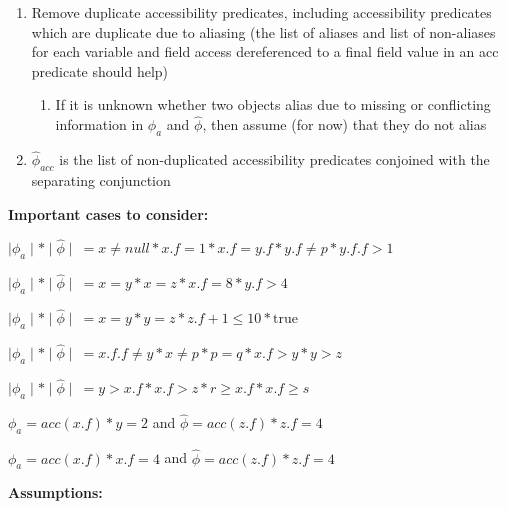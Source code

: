\documentclass {article}
\newcommand{\true}{\text{true}}
\newcommand{\fphi}{\widehat{\phi}}
\begin{document}
\begin{enumerate}
\item Remove duplicate accessibility predicates, including accessibility predicates which are duplicate due to aliasing (the list of aliases and list of non-aliases for each variable and field access dereferenced to a final field value in an acc predicate should help)
	\begin{enumerate}
	\item If it is unknown whether two objects alias due to missing or conflicting information in $\phi_a$ and $\fphi$, then assume (for now) that they do not alias
	\end{enumerate}
\item $\fphi_{acc}$ is the list of non-duplicated accessibility predicates conjoined with the separating conjunction
\end{enumerate}

\textbf{Important cases to consider:}

$\mid \phi_a \mid \ast \mid \fphi \mid \ = x \neq null \ast x.f = 1 \ast x.f = y.f \ast y.f \neq p \ast y.f.f > 1$

$\mid \phi_a \mid \ast \mid \fphi \mid \ = x = y \ast x = z \ast x.f = 8 \ast y.f > 4$

$\mid \phi_a \mid \ast \mid \fphi \mid \ = x = y \ast y = z \ast z.f + 1 \leq 10 \ast \true$

$\mid \phi_a \mid \ast \mid \fphi \mid \ = x.f.f \neq y \ast x \neq p \ast p = q \ast x.f > y \ast y > z$

$\mid \phi_a \mid \ast \mid \fphi \mid \ = y > x.f \ast x.f > z \ast r \geq x.f \ast x.f \geq s$

$\phi_a = acc(x.f) \ast y = 2$ and $\fphi = acc(z.f) \ast z.f = 4$

$\phi_a = acc(x.f) \ast x.f = 4$ and $\fphi = acc(z.f) \ast z.f = 4$

\textbf{Assumptions:}
\end{document}
